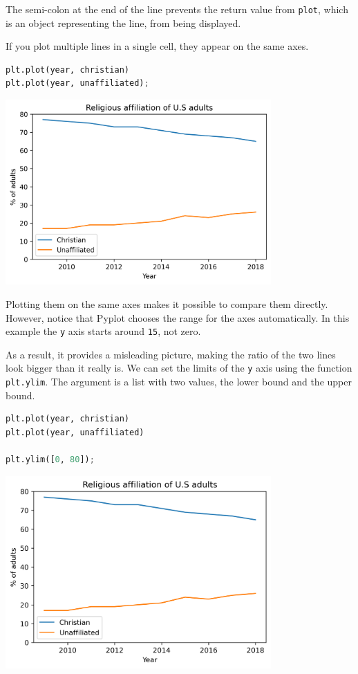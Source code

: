 The semi-colon at the end of the line prevents the return value from
\passthrough{\lstinline!plot!}, which is an object representing the
line, from being displayed.

If you plot multiple lines in a single cell, they appear on the same
axes.

\begin{lstlisting}[language=Python,style=source]
plt.plot(year, christian)
plt.plot(year, unaffiliated);
\end{lstlisting}

\begin{center}
\includegraphics[width=4in]{chapters/06_plotting_files/06_plotting_31_0.png}
\end{center}

Plotting them on the same axes makes it possible to compare them
directly. However, notice that Pyplot chooses the range for the axes
automatically. In this example the \passthrough{\lstinline!y!} axis
starts around \passthrough{\lstinline!15!}, not zero.

As a result, it provides a misleading picture, making the ratio of the
two lines look bigger than it really is. We can set the limits of the
\passthrough{\lstinline!y!} axis using the function
\passthrough{\lstinline!plt.ylim!}. The argument is a list with two
values, the lower bound and the upper bound.

\begin{lstlisting}[language=Python,style=source]
plt.plot(year, christian)
plt.plot(year, unaffiliated)

plt.ylim([0, 80]);
\end{lstlisting}

\begin{center}
\includegraphics[width=4in]{chapters/06_plotting_files/06_plotting_33_0.png}
\end{center}

